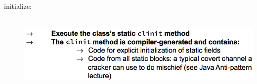 \documentclass[10pt]{article}
\begin{document}
\begin{description}
	\item[initialize:] \hfill \\ \includegraphics[scale=0.4]{class-loader-initialize.png}
\end{description}
\end{document}
